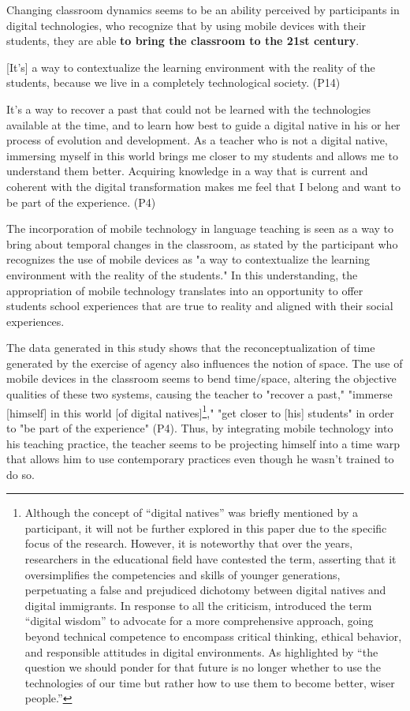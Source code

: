 Changing classroom dynamics seems to be an ability perceived by
participants in digital technologies, who recognize that by using mobile
devices with their students, they are able \textbf{to bring the
classroom to the 21st century}.


{[}It's{]} a way to contextualize the learning
environment with the reality of the students, because we live in a
completely technological society. (P14)

It's a way to recover a past that could not be learned
with the technologies available at the time, and to learn how best to
guide a digital native in his or her process of evolution and
development. As a teacher who is not a digital native, immersing myself
in this world brings me closer to my students and allows me to
understand them better. Acquiring knowledge in a way that is current and
coherent with the digital transformation makes me feel that I belong and
want to be part of the experience. (P4)

The incorporation of mobile technology in language teaching is seen as a
way to bring about temporal changes in the classroom, as stated by the
participant who recognizes the use of mobile devices as "a way to
contextualize the learning environment with the reality of the
students." In this understanding, the appropriation of mobile technology
translates into an opportunity to offer students school experiences that
are true to reality and aligned with their social experiences.

The data generated in this study shows that the reconceptualization of
time generated by the exercise of agency also influences the notion of
space. The use of mobile devices in the classroom seems to bend
time/space, altering the objective qualities of these two systems,
causing the teacher to "recover a past," "immerse {[}himself{]} in this
world {[}of digital natives{]}\footnote{ Although the concept of
  ``digital natives'' \cite{prensky2001a} was briefly mentioned by a
  participant, it will not be further explored in this paper due to the
  specific focus of the research. However, it is noteworthy that over
  the years, researchers in the educational field have contested the
  term, asserting that it oversimplifies the competencies and skills of
  younger generations, perpetuating a false and prejudiced dichotomy
  between digital natives and digital immigrants. In response to all the
  criticism, \textcite{prensky2011} introduced the term ``digital wisdom'' to
  advocate for a more comprehensive approach, going beyond technical
  competence to encompass critical thinking, ethical behavior, and
  responsible attitudes in digital environments. As highlighted by
  \textcite[p.~8]{prensky2011} ``the question we should ponder for that future
  is no longer whether to use the technologies of our time but rather
  how to use them to become better, wiser people.''}," "get closer to
{[}his{]} students" in order to "be part of the experience" (P4). Thus,
by integrating mobile technology into his teaching practice, the teacher
seems to be projecting himself into a time warp that allows him to use
contemporary practices even though he wasn't trained to
do so.

